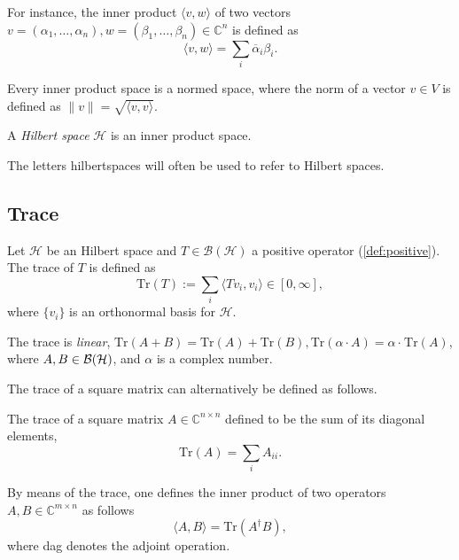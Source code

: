For instance, the inner product $ \langle v, w \rangle$ of two vectors $ v = (\alpha_1, \ldots, \alpha_n ),w = (\beta_1, \ldots, \beta_n) \in \mathbb{C}^{n}$ is defined as
\begin{equation*}
  \langle v, w \rangle = \sum_{i} \overline{\alpha}_i \beta_i. 
\end{equation*}

Every inner product space is a normed space, where the norm of a vector $v \in V$ is defined as $\|v\| = \sqrt{\langle v, v \rangle}$.


\begin{definition}
  A \emph{Hilbert space} $\mathcal{H}$ is an inner product space.
\end{definition}


The letters \gls{hilbertspaces} will often be used to refer to Hilbert spaces.





\subsection{Trace}

\begin{definition} \label{def:trace} 
  Let $\mathcal{H}$ be an Hilbert space and $ T \in \mathcal{B}(\mathcal{H})$ a positive operator (\autoref{def:positive}). The trace of $T$ is defined as 
\[
\text{Tr}(T) := \sum_i \langle T v_i, v_i \rangle \in [0, \infty],
\]
where $\{v_i\}$ is an orthonormal basis for $\mathcal{H}$.
\end{definition}


The trace is \emph{linear}, $\text{Tr}(A + B) = \text{Tr}(A)+\text{Tr}(B), \text{Tr}(\alpha \cdot A) = \alpha \cdot \hspace{1pt} \text{Tr}(A)$, where $A, B \in \mathcal{B}(\mathcal{H})$, and $\alpha$ is a complex number.

The trace of a square matrix can alternatively be defined as follows.

\begin{definition}
  The trace of a square matrix $A\in \mathbb{C}^{n\times n}$ defined to be the sum of its diagonal elements,
\begin{equation*}
  \text{Tr}(A)= \sum_{i} A_{ii}.
\end{equation*}

\end{definition}

By means of the trace, one defines the inner product of two operators $A,B\in \mathbb{C}^{m \times n}$ as follows
\begin{equation*} \label{eq:inner_product_matrix}
  \langle A, B \rangle = \text{Tr}(A^{\dagger}B),
\end{equation*}
where \gls{dag} denotes the adjoint operation.




